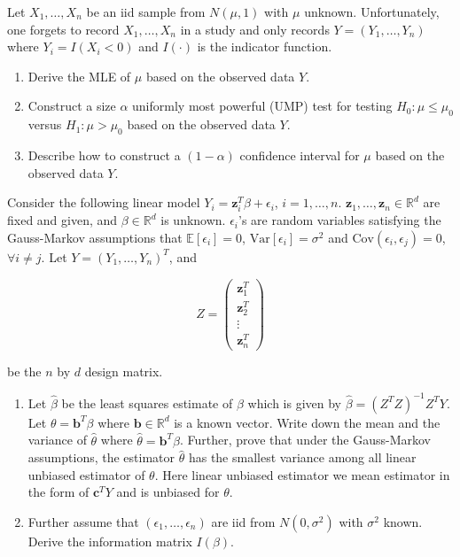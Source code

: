 \documentclass[11pt,a4paper]{article}
\newcommand{\examstatement}[1]{%
  \par\addvspace{0.85em}%
  \noindent{\bfseries #1}\par\nobreak\addvspace{0.28em}%
}
\begin{document}
\examstatement{Problem 7. [10 pts.]}
Let \( X_1, \dots, X_n \) be an iid sample from \( N(\mu, 1) \) with \( \mu \) unknown. Unfortunately, one forgets to record \( X_1, \dots, X_n \) in a study and only records \( Y = (Y_1, \dots, Y_n) \) where \( Y_i = I(X_i < 0) \) and \( I(\cdot) \) is the indicator function.
\begin{enumerate}[label=(\alph*)]
    \item Derive the MLE of \( \mu \) based on the observed data \( Y \).
    \item Construct a size \( \alpha \) uniformly most powerful (UMP) test for testing \( H_0 : \mu \le \mu_0 \) versus \( H_1 : \mu > \mu_0 \) based on the observed data \( Y \).
    \item Describe how to construct a \( (1 - \alpha) \) confidence interval for \( \mu \) based on the observed data \( Y \).
\end{enumerate}

\examstatement{Problem 8. [10 pts.]}
Consider the following linear model \( Y_i = \mathbf{z}_i^T \beta + \epsilon_i \), \( i = 1, \dots, n \). \( \mathbf{z}_1, \dots, \mathbf{z}_n \in \mathbb{R}^d \) are fixed and given, and \( \beta \in \mathbb{R}^d \) is unknown. \( \epsilon_i \)'s are random variables satisfying the Gauss-Markov assumptions that \( \mathbb{E}[\epsilon_i] = 0 \), \( \mathrm{Var}[\epsilon_i] = \sigma^2 \) and \( \mathrm{Cov}(\epsilon_i, \epsilon_j) = 0 \), \( \forall i \neq j \). Let \( Y = (Y_1, \dots, Y_n)^T \), and

\[
Z =
\begin{pmatrix}
\mathbf{z}_1^T \\
\mathbf{z}_2^T \\
\vdots \\
\mathbf{z}_n^T
\end{pmatrix}
\]

be the \( n \) by \( d \) design matrix.
\begin{enumerate}[label=(\alph*)]
    \item Let \( \hat{\beta} \) be the least squares estimate of \( \beta \) which is given by \( \hat{\beta} = (Z^T Z)^{-1} Z^T Y \). Let \( \theta = \mathbf{b}^T \beta \) where \( \mathbf{b} \in \mathbb{R}^d \) is a known vector. Write down the mean and the variance of \( \hat{\theta} \) where \( \hat{\theta} = \mathbf{b}^T \hat{\beta} \). Further, prove that under the Gauss-Markov assumptions, the estimator \( \hat{\theta} \) has the smallest variance among all linear unbiased estimator of \( \theta \). Here linear unbiased estimator we mean estimator in the form of \( \mathbf{c}^T Y \) and is unbiased for \( \theta \).
    \item Further assume that \( (\epsilon_1, \dots, \epsilon_n) \) are iid from \( N(0, \sigma^2) \) with \( \sigma^2 \) known. Derive the information matrix \( I(\beta) \).
\end{enumerate}
\end{document}
